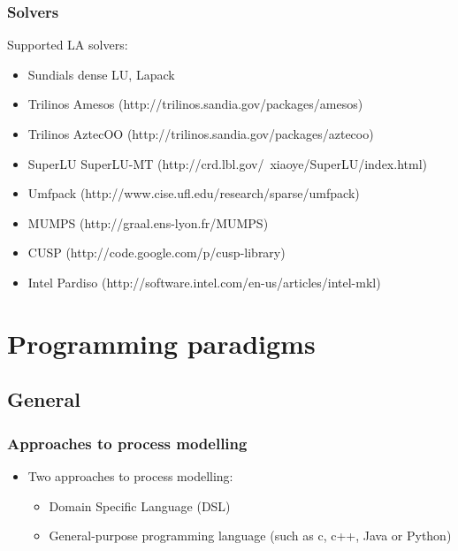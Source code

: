 \documentclass{beamer}
\begin{document}
\begin{frame}
\frametitle{Solvers}
\begin{block}{}
Supported LA solvers:
\begin{itemize}
  \item Sundials dense LU, Lapack
  \item Trilinos Amesos ({\small http://trilinos.sandia.gov/packages/amesos}) 
  \item Trilinos AztecOO ({\small http://trilinos.sandia.gov/packages/aztecoo}) 
  \item SuperLU SuperLU-MT ({\small http://crd.lbl.gov/~xiaoye/SuperLU/index.html}) 
  \item Umfpack ({\small http://www.cise.ufl.edu/research/sparse/umfpack}) 
  \item MUMPS ({\small http://graal.ens-lyon.fr/MUMPS})
  \item CUSP ({\small http://code.google.com/p/cusp-library}) 
  \item Intel Pardiso ({\small http://software.intel.com/en-us/articles/intel-mkl})
\end{itemize}
\end{block}
\end{frame}



\section{Programming paradigms}

\subsection{General}
\begin{frame}
\frametitle{Approaches to process modelling}
\begin{block}{}
\begin{itemize}
  \item Two approaches to process modelling:
  \begin{itemize}
    \item Domain Specific Language (DSL)
    \item General-purpose programming language (such as c, c++, Java or Python)
  \end{itemize}
\end{itemize}
\end{block}
\end{frame}
\end{document}
